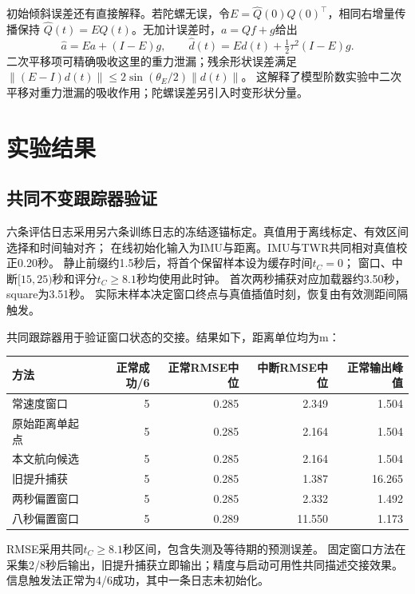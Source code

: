 \documentclass[11pt,a4paper]{ctexart}
\begin{document}
初始倾斜误差还有直接解释。若陀螺无误，令$E=\hat Q(0)Q(0)^\top$，相同右增量传播保持
$\hat Q(t)=EQ(t)$。无加计误差时，$a=Qf+g$给出
\begin{equation}
 \hat a=Ea+(I-E)g,\qquad
 \hat d(t)=E d(t)+\tfrac12\tau^2(I-E)g.
\end{equation}
二次平移项可精确吸收这里的重力泄漏；残余形状误差满足
$\|(E-I)d(t)\|\leq2\sin(\theta_E/2)\|d(t)\|$。
这解释了模型阶数实验中二次平移对重力泄漏的吸收作用；陀螺误差另引入时变形状分量。

\section{实验结果}
\subsection{共同不变跟踪器验证}
六条评估日志采用另六条训练日志的冻结逐锚标定。真值用于离线标定、有效区间选择和时间轴对齐；
在线初始化输入为IMU与距离。IMU与TWR共同相对真值校正0.20秒。
静止前缀约1.5秒后，将首个保留样本设为缓存时间$t_C=0$；
窗口、中断$[15,25)$秒和评分$t_C\ge8.1$秒均使用此时钟。
首次两秒捕获对应加载器约3.50秒，square为3.51秒。
实际末样本决定窗口终点与真值插值时刻，恢复由有效测距间隔触发。

共同跟踪器用于验证窗口状态的交接。结果如下，距离单位均为m：

\begin{center}\small
\begin{tabular}{lrrrr}
\toprule
方法&正常成功/6&正常RMSE中位&中断RMSE中位&正常输出峰值\\
\midrule
常速度窗口&5&0.285&2.349&1.504\\
原始距离单起点&5&0.285&2.164&1.504\\
本文航向候选&5&0.285&2.164&1.504\\
旧提升捕获&5&0.285&1.387&16.265\\
两秒偏置窗口&5&0.285&2.332&1.492\\
八秒偏置窗口&5&0.289&11.550&1.173\\
\bottomrule
\end{tabular}
\end{center}
RMSE采用共同$t_C\ge8.1$秒区间，包含失测及等待期的预测误差。
固定窗口方法在采集2/8秒后输出，旧提升捕获立即输出；精度与启动可用性共同描述交接效果。
信息触发法正常为4/6成功，其中一条日志未初始化。
\end{document}
